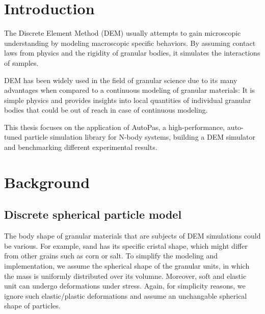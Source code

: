 \documentclass[11pt,
               a4paper,
               bibtotoc,
               idxtotoc,
               headsepline,
               footsepline,
               footexclude,
               BCOR12mm,
               DIV13,
               openany,   %
               ]
               {scrbook}
\begin{document}
\lipsum[2]

\cleardoublepage


\tableofcontents
\thispagestyle{empty}
\cleardoubleemptypage


\mainmatter
\part{Introduction}
\label{sec:introduction}
The Discrete Element Method (DEM) usually attempts to gain microscopic understanding by modeling macroscopic specific behaviors. By assuming contact laws from physics and the rigidity of granular bodies, it simulates the interactions of samples. 

DEM has been widely used in the field of granular science due to its many advantages  when compared to a continuous modeling of granular materials: It is simple physics and provides insights into local quantities of individual granular bodies that could be out of reach in case of continuous modeling.

This thesis focuses on the application of AutoPas, a high-performance, auto-tuned particle simulation library for N-body systems, building a DEM simulator and benchmarking different experimental results.

\part{Background}
\chapter{Discrete spherical particle model}
\label{sec:discrete_spherical_particle_model}

The body shape of granular materials that are subjects of DEM simulations could be various. For example, sand has its specific cristal shape, which might differ from other grains such as corn or salt. 
To simplify the modeling and implementation, we assume the spherical shape of the granular units, in which the mass is uniformly distributed over its volumne.
Moreover, soft and elastic unit can undergo deformations under stress. Again, for simplicity reasons, we ignore such elastic/plastic deformations and assume an unchangable spherical shape of particles.
\end{document}
